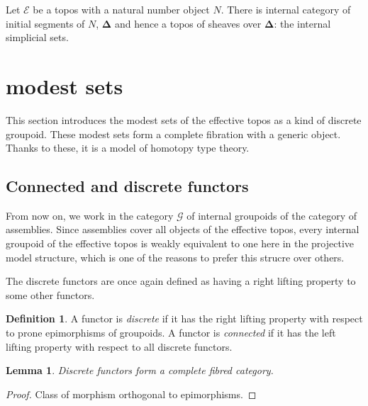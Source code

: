 \documentclass{amsart}
\theoremstyle{plain}
\newtheorem{lemma}[theorem]{Lemma}
\theoremstyle{definition}
\newtheorem{defin}[theorem]{Definition}
\newcommand\hide[1]{}
\newcommand\cat\mathcal
\begin{document}
Let $\cat E$ be a topos with a natural number object $N$. There is internal category of initial segments of $N$, $\mathbf \Delta$ and hence a topos of sheaves over $\mathbf \Delta$: the internal simplicial sets. 
\hide{In the effective topos, where the global sections functors preserves the natural number object, this is a subcatgeory of the topos of simplicial objects of the effective topos.}

\hide{niet te algemeen maken}

\section{modest sets}
This section introduces the modest sets of the effective topos as a kind of discrete groupoid. These modest sets form a complete fibration with a generic object. Thanks to these, it is a model of homotopy type theory.



\subsection{Connected and discrete functors}
From now on, we work in the category $\cat G$ of internal groupoids of the category of assemblies. Since assemblies cover all objects of the effective topos, every internal groupoid of the effective topos is weakly equivalent to one here in the projective model structure, which is one of the reasons to prefer this strucre over others.

The discrete functors are once again defined as having a right lifting property to some other functors.


\begin{defin} A functor is \emph{discrete} if it has the right lifting property with respect to prone epimorphisms of groupoids. A functor is \emph{connected} if it has the left lifting property with respect to all discrete functors.
\end{defin}%

\hide{Rosolini's topos bestaat uit objecten die de liftingeigenschap hebben ten opzichte van kleine groepen. }

\begin{lemma} Discrete functors form a complete fibred category. \end{lemma}

\begin{proof} Class of morphism orthogonal to epimorphisms. \end{proof}
\end{document}
